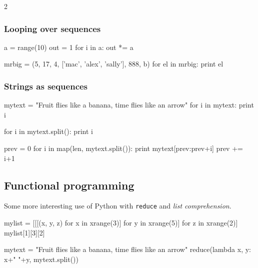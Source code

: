 \documentclass[draft=false]{article}
\def\pythoni{\lstinline[language=pythontim]}
\begin{document}
\begin{multicols}{2}

\subsubsection{Looping over sequences}

\begin{python}
a = range(10)
out = 1
for i in a:
	out *= a
\end{python}

\begin{python}
mrbig = (5, 17, 4, ['mac', 'alex', 'sally'], 888, b)
for el in mrbig:
	print el
\end{python}

\columnbreak

\subsubsection{Strings as sequences}

\begin{python}
mytext = "Fruit flies like a banana, time flies like 
	an arrow"
for i in mytext:
	print i

for i in mytext.split():
	print i

prev = 0
for i in map(len, mytext.split()):
	print mytext[prev:prev+i]
	prev += i+1
\end{python}

\end{multicols}

\subsection{Functional programming}

Some more interesting use of Python with \pythoni{reduce} and \emph{list comprehension}.

\begin{python}
mylist = [[[(x, y, z) for x in xrange(3)] for y in xrange(5)] for z in xrange(2)]
mylist[1][3][2]
\end{python}

\begin{python}
mytext = "Fruit flies like a banana, time flies like an arrow"
reduce(lambda x, y: x+" "+y, mytext.split())
\end{python}

\end{document}
